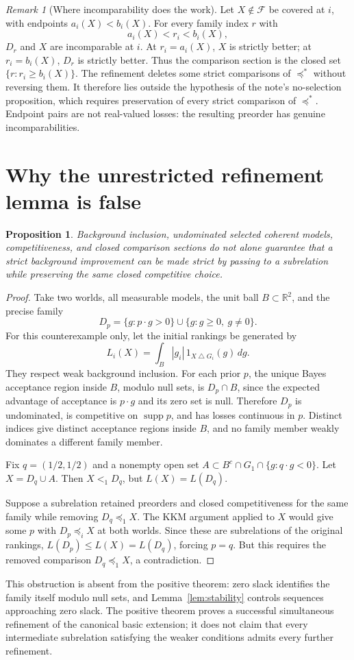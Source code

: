 \documentclass[11pt]{article}
\newtheorem{proposition}[theorem]{Proposition}
\theoremstyle{remark}
\newtheorem{remark}[theorem]{Remark}
\newcommand{\R}{\mathbb R}
\newcommand{\supp}{\operatorname{supp}}
\newcommand{\sd}{\mathbin{\triangle}}
\newcommand{\F}{\mathcal F}
\begin{document}
\begin{remark}[Where incomparability does the work]
Let $X\notin\F$ be covered at $i$, with endpoints $a_i(X)<b_i(X)$.
For every family index $r$ with
\[
 a_i(X)<r_i<b_i(X),
\]
$D_r$ and $X$ are incomparable at $i$. At $r_i=a_i(X)$, $X$ is strictly
better; at $r_i=b_i(X)$, $D_r$ is strictly better. Thus the comparison section
is the closed set $\{r:r_i\ge b_i(X)\}$.
The refinement deletes some strict comparisons of $\preceq^*$ without reversing
them. It therefore lies outside the hypothesis of the note's no-selection
proposition, which requires preservation of every strict comparison of
$\preceq^*$. Endpoint pairs are not real-valued losses: the resulting preorder
has genuine incomparabilities.
\end{remark}

\section{Why the unrestricted refinement lemma is false}

\begin{proposition}\label{prop:counterexample}
Background inclusion, undominated selected coherent models, competitiveness,
and closed comparison sections do not alone guarantee that a strict background
improvement can be made strict by passing to a subrelation while preserving
the same closed competitive choice.
\end{proposition}
\begin{proof}
Take two worlds, all measurable models, the unit ball $B\subset\R^2$, and
the precise family
\[
 D_p=\{g:p\cdot g>0\}\cup\{g:g\ge0,\ g\ne0\}.
\]
For this counterexample only, let the initial rankings be generated by
\[
 L_i(X)=\int_B |g_i|\,1_{X\sd G_i}(g)\,dg.
\]
They respect weak background inclusion. For each prior $p$, the unique Bayes
acceptance region inside $B$, modulo null sets, is $D_p\cap B$, since the
expected advantage of acceptance is $p\cdot g$ and its zero set is null.
Therefore $D_p$ is undominated, is competitive on $\supp p$, and has losses
continuous in $p$. Distinct indices give distinct acceptance regions inside
$B$, and no family member weakly dominates a different family member.

Fix $q=(1/2,1/2)$ and a nonempty open set
$A\subset B^c\cap G_1\cap\{g:q\cdot g<0\}$. Let $X=D_q\cup A$.
Then $X<_1D_q$, but $L(X)=L(D_q)$.

Suppose a subrelation retained preorders and closed competitiveness for the
same family while removing $D_q\preceq_1X$. The KKM argument applied to $X$
would give some $p$ with $D_p\preceq_iX$ at both worlds. Since these are
subrelations of the original rankings, $L(D_p)\le L(X)=L(D_q)$, forcing
$p=q$. But this requires the removed comparison $D_q\preceq_1X$, a
contradiction.
\end{proof}

This obstruction is absent from the positive theorem: zero slack identifies
the family itself modulo null sets, and Lemma~\ref{lem:stability} controls
sequences approaching zero slack. The positive theorem proves a successful
simultaneous refinement of the canonical basic extension; it does not claim
that every intermediate subrelation satisfying the weaker conditions admits
every further refinement.
\end{document}
